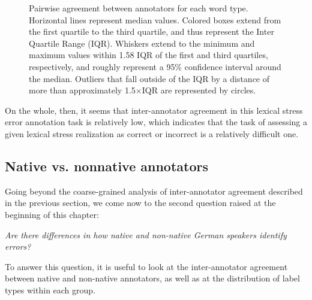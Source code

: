 \begin{figure}[phtb]
			\caption[Pairwise agreement statistics by word type]{Pairwise agreement between annotators for each word type. 	
			Horizontal lines represent median values. Colored boxes extend from the first quartile to the third quartile, and thus represent the Inter Quartile Range (IQR). Whiskers extend to the minimum and maximum values within 1.58 IQR of the first and third quartiles, respectively, and roughly represent a 95\% confidence interval around the median. 
			 Outliers that fall outside of the IQR by a distance of more than approximately 1.5$\times$IQR  are represented by circles.
			}
			\label{fig:agreement:words}
		\end{figure}
		
		
	
		
		 On the whole, then, it seems that inter-annotator agreement in this lexical stress error annotation task is relatively low, which indicates that the task of assessing a given lexical stress realization as correct or incorrect is a relatively difficult one. 
	
	
		\subsection{Native vs. nonnative annotators}
		\label{sec:agreement:native}

		
		
		Going beyond the coarse-grained analysis of inter-annotator agreement described in the previous section, we come now to the second question raised at the beginning of this chapter:
		
		\textit{Are there differences in how native and non-native German speakers identify errors?}
		
		
		To answer this question, it is useful to look at the inter-annotator agreement between native and non-native annotators, as well as at the distribution of label types within each group. 
		
